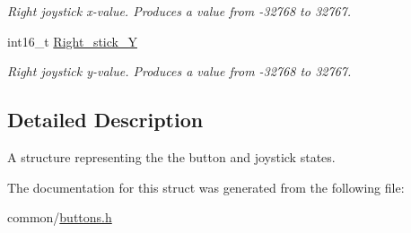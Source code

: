 \begin{DoxyCompactItemize}
\begin{DoxyCompactList}\small\item\em Right joystick x-\/value. Produces a value from -\/32768 to 32767. \end{DoxyCompactList}\item 
\hypertarget{structbutton_acabf34ad61f696e479607ca456f25fc4}{int16\-\_\-t \hyperlink{structbutton_acabf34ad61f696e479607ca456f25fc4}{Right\-\_\-stick\-\_\-\-Y}}\label{structbutton_acabf34ad61f696e479607ca456f25fc4}

\begin{DoxyCompactList}\small\item\em Right joystick y-\/value. Produces a value from -\/32768 to 32767. \end{DoxyCompactList}\end{DoxyCompactItemize}


\subsection{Detailed Description}
A structure representing the the button and joystick states. 

The documentation for this struct was generated from the following file\-:\begin{DoxyCompactItemize}
\item 
common/\hyperlink{buttons_8h}{buttons.\-h}\end{DoxyCompactItemize}
